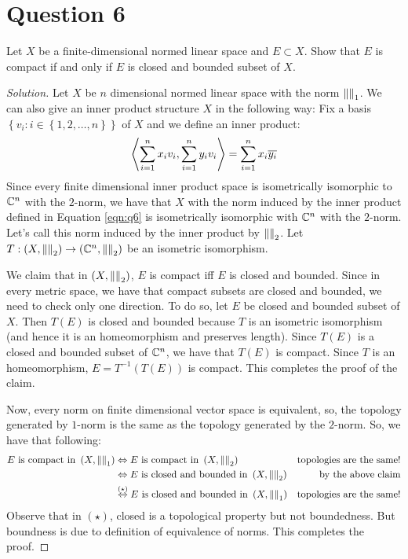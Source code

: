 \section{Question 6}
\horz
Let $X$ be a finite-dimensional normed linear space and $E\subset X$. Show that $E$ is compact if and only if $E$ is closed and bounded subset of $X.$ 
\horz

\begin{proof}[Solution]
    Let $X$ be $n$ dimensional normed linear space with the norm $\left\lVert  \right\rVert_{1}$. We can also give an inner product structure $X$ in the following way: Fix a basis $\left\{ v_{i} : i\in \left\{ 1,2,\ldots , n \right\} \right\}$ of $X$ and we define an inner product:
    \begin{equation}
	\left\langle \sum_{i=1}^{n} x_{i}v_{i}, \sum_{i=1}^{n} y_{i}v_{i} \right\rangle = \sum_{i=1}^{n} x_{i}\overline{y_{i}}	
	\label{eqn:q6}
    \end{equation}
    Since every finite dimensional inner product space is isometrically isomorphic to $\mathbb C^{n}$ with the $2$-norm, we have that $X$ with the norm induced by the inner product defined in Equation \ref{eqn:q6} is isometrically isomorphic with $\mathbb C^{n}$ with the $2$-norm. Let's call this norm induced by the inner product by $\left\lVert  \right\rVert_{2}$. Let $T: \left( X, \left\lVert  \right\rVert_{2} \right) \to \left( \mathbb C^{n} , \left\lVert  \right\rVert_{2} \right)$ be an isometric isomorphism.

    We claim that in $\left( X, \left\lVert  \right\rVert_{2} \right)$, $E$ is compact iff $E$ is closed and bounded. Since in every metric space, we have that compact subsets are closed and bounded, we need to check only one direction. To do so, let $E$ be closed and bounded subset of $X$. Then $T(E)$ is closed and bounded because $T$ is an isometric isomorphism (and hence it is an homeomorphism and preserves length). Since $T(E)$ is a closed and bounded subset of $\mathbb C ^{n}$, we have that $T\left( E \right)$ is compact. Since $T$ is an homeomorphism, $E=T^{-1} \left( T\left( E \right) \right)$ is compact. This completes the proof of the claim.

    Now, every norm on finite dimensional vector space is equivalent, so, the topology generated by $1$-norm is the same as the topology generated by the $2$-norm. So, we have that following:
    \begin{align*}
	E \text{ is compact in } \left( X, \left\lVert  \right\rVert_{1} \right) & \Leftrightarrow E \text{ is compact in } \left( X, \left\lVert  \right\rVert_{2} \right) & \text{topologies are the same!} \\
    & \Leftrightarrow E \text{ is closed and bounded in } \left( X, \left\lVert  \right\rVert_{2} \right) & \text{by the above claim} \\
& \stackrel{(\star )}{\Leftrightarrow} E \text{ is closed and bounded in } \left( X, \left\lVert  \right\rVert_{1} \right) & \text{topologies are the same!} \\
    \end{align*}
    Observe that in $\left( \star \right)$, closed is a topological property but not boundedness. But boundness is due to definition of equivalence of norms. This completes the proof.
\end{proof}
